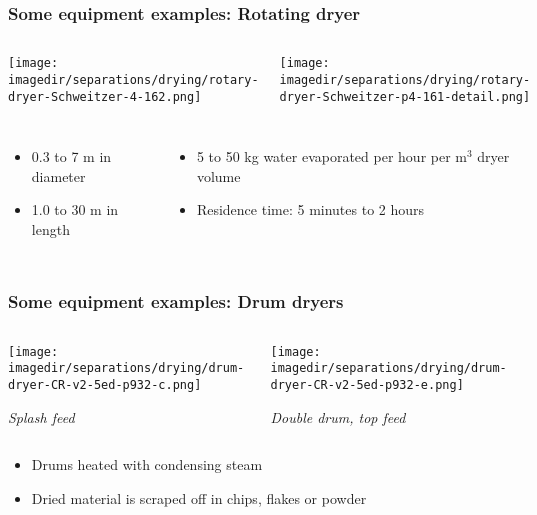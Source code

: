 \begin{frame}\frametitle{Some equipment examples: Rotating dryer}
	\begin{columns}[t]
			\begin{center}
				\texttt{[image: \\imagedir/separations/drying/rotary-dryer-Schweitzer-4-162.png]}
			\end{center}
			\begin{center}
				\texttt{[image: \\imagedir/separations/drying/rotary-dryer-Schweitzer-p4-161-detail.png]}
			\end{center}
	\end{columns}
	
	\begin{columns}[t]
			\begin{itemize}
				\item	0.3 to 7 m in diameter
				\item	1.0 to 30 m in length
			\end{itemize}
			\begin{itemize}
				\item	5 to 50 kg water evaporated per hour per m$^3$ dryer volume
				\item	Residence time: 5 minutes to 2 hours
			\end{itemize}
	\end{columns}
\end{frame}

\begin{frame}\frametitle{Some equipment examples: Drum dryers}
	\begin{columns}[b]
			\begin{center}
				\texttt{[image: \\imagedir/separations/drying/drum-dryer-CR-v2-5ed-p932-c.png]}
				
				\vspace{12pt}
				\emph{Splash feed}
			\end{center}
			
			
			\begin{center}
				\texttt{[image: \\imagedir/separations/drying/drum-dryer-CR-v2-5ed-p932-e.png]}
				
				\vspace{12pt}
				\emph{Double drum, top feed}
			\end{center}
	\end{columns}
	\begin{itemize}
		\item	Drums heated with condensing steam
		\item	Dried material is scraped off in chips, flakes or powder
	\end{itemize}
\end{frame}

